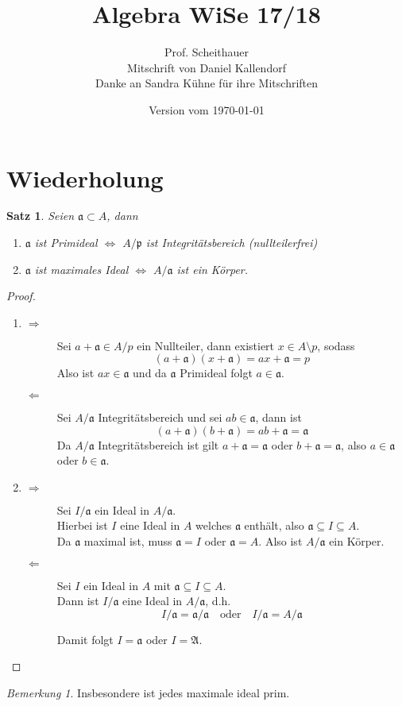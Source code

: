 \documentclass[10pt,a4paper]{article}
\title{Algebra WiSe 17/18}
\author{Prof. Scheithauer\\
Mitschrift von Daniel Kallendorf\\
\small Danke an Sandra Kühne für ihre Mitschriften}
\date{Version vom \today}
\theoremstyle{plain}
\newtheorem{satz}[theorem]{Satz}
\theoremstyle{definition}
\theoremstyle{remark}
\newtheorem*{bem*}{Bemerkung}
\begin{document}
	
	\maketitle
	\tableofcontents
	
	\section{Wiederholung}
	
	\begin{satz}
		Seien $\mathfrak a\subset A$, dann
		\begin{enumerate}
			\item $\mathfrak a$ ist Primideal $\Leftrightarrow$ $A/\mathfrak p$ ist Integritätsbereich (nullteilerfrei)
			\item $\mathfrak a$ ist maximales Ideal $\Leftrightarrow$ $A/\mathfrak a$ ist ein Körper.
		\end{enumerate}
	\end{satz}
	\begin{proof}
		\begin{enumerate}
			\item \begin{description}
				\item[$\Rightarrow$] Sei $a+\mathfrak a\in A/p$ ein Nullteiler, dann existiert $x\in A\setminus p$, sodass
				\[(a+\mathfrak a)(x+\mathfrak a)=ax+\mathfrak a=p\]
				Also ist $ax\in \mathfrak a$ und da $\mathfrak a$ Primideal folgt $a\in\mathfrak a$.
				\item[$\Leftarrow$] Sei $A/\mathfrak a$ Integritätsbereich und sei $ab\in\mathfrak a$, dann ist
				\[(a+\mathfrak a)(b+\mathfrak a)=ab+\mathfrak a=\mathfrak a\]
				Da $A/\mathfrak a$ Integritätsbereich ist gilt $a+\mathfrak a=\mathfrak a$ oder $b+\mathfrak a=\mathfrak a$, also $a\in\mathfrak a$ oder $b\in\mathfrak a$.
			\end{description}
			\item \begin{description}
				\item[$\Rightarrow$] Sei $I/\mathfrak a$ ein Ideal in $A/\mathfrak a$.\\
				Hierbei ist $I$ eine Ideal in $A$ welches $\mathfrak a$ enthält, also $\mathfrak a\subseteq I\subseteq A$.\\
				Da $\mathfrak a$ maximal ist, muss $\mathfrak a=I$ oder $\mathfrak a=A$. Also ist $A/\mathfrak a$ ein Körper.
				\item[$\Leftarrow$] Sei $I$ ein Ideal in $A$ mit $\mathfrak a\subseteq I\subseteq A$.\\
				Dann ist $I/\mathfrak a$ eine Ideal in $A/\mathfrak a$, d.h.
				\[I/\mathfrak a=\mathfrak a/\mathfrak a\quad\text{oder}\quad I/\mathfrak a=A/\mathfrak a\]
				
				Damit folgt $I=\mathfrak a$ oder $I=\mathfrak A$.
			\end{description}
		\end{enumerate}
	\end{proof}
	\begin{bem*}
		Insbesondere ist jedes maximale ideal prim.
	\end{bem*}
\end{document}
